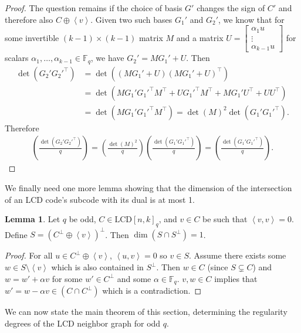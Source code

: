 \documentclass[11pt]{article}
\theoremstyle{definition}
\newtheorem{lemma}[theorem]{Lemma}
\newcommand{\F}{\mathbb{F}}
\newcommand{\Leg}[2]{\left(\frac{#1}{#2}\right)}                       %
\newcommand{\Ang}[1]{\left\langle#1\right\rangle}
\newcommand{\LCDq}[2]{\mathrm{LCD} {[#1, #2]}_q}
\begin{document}
\begin{proof}
	The question remains if the choice of basis $G'$ changes the sign of $C'$ and therefore also $C \oplus \Ang{v}$.
	Given two such bases $G_1'$ and $G_2'$, we know that for some invertible $(k - 1) \times (k - 1)$ matrix $M$ and a matrix $U = \begin{bmatrix} \alpha_1 u \\ \vdots \\ \alpha_{k - 1} u \end{bmatrix}$ for scalars $\alpha_1, \ldots, \alpha_{k - 1} \in \F_q$, we have $G_2' = M G_1' + U$.
	Then
	\begin{align*}
		\det(G_2' G_2'^\top)
		&= \det((M G_1' + U){(M G_1' + U)}^\top) \\
		&= \det(M G_1' G_1'^\top M^\top + U G_1'^\top M^\top + M G_1' U^\top + U U^\top) \\
		&= \det(M G_1' G_1'^\top M^\top)
		 = {\det(M)}^2 \det(G_1' G_1'^\top).
	\end{align*}
	Therefore
	\begin{align*}
		\Leg{\det(G_2' G_2'^\top)}{q}
		= \Leg{{\det(M)}^2}{q} \Leg{\det(G_1' G_1'^\top)}{q}
		= \Leg{\det(G_1' G_1'^\top)}{q}.
	\end{align*}
\end{proof}

We finally need one more lemma showing that the dimension of the intersection of an LCD code's subcode with its dual is at most 1.

\begin{lemma}\label{lem:subcode-hulldim}
	Let $q$ be odd, $C \in \LCDq{n}{k}$, and $v \in C$ be such that $\Ang{v, v} = 0$.
	Define $S = {(C^\bot \oplus \Ang{v})}^\bot$.
	Then $\dim(S \cap S^\bot) = 1$.
\end{lemma}

\begin{proof}
	For all $u \in C^\bot \oplus \Ang{v}$, $\Ang{u, v} = 0$ so $v \in S$.
	Assume there exists some $w \in S \setminus \Ang{v}$ which is also contained in $S^\bot$.
	Then $w \in C$ (since $S \subsetneq C$) and $w = w' + \alpha v$ for some $w' \in C^\bot$ and some $\alpha \in \F_q$.
	$v, w \in C$ implies that $w' = w - \alpha v \in (C \cap C^\bot)$ which is a contradiction.
\end{proof}

We can now state the main theorem of this section, determining the regularity degrees of the LCD neighbor graph for odd $q$.
\end{document}
